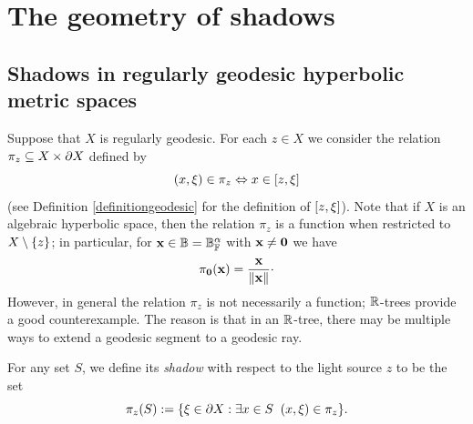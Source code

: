 %
%



\bigskip
\section{The geometry of shadows}\label{subsectionshadows}

\subsection{Shadows in regularly geodesic hyperbolic metric spaces}
Suppose that $X$ is regularly geodesic. For each $z\in X$ we consider the relation $\pi_z\subseteq X\times\partial X$ defined by
\[
(x,\xi)\in \pi_z \Leftrightarrow x\in [z,\xi]
\]
(see Definition \ref{definitiongeodesic} for the definition of $[z,\xi]$). Note that if $X$ is an algebraic hyperbolic space, then the relation $\pi_z$ is a function when restricted to $X\setminus\{z\}$; in particular, for $\xx\in \B = \B_\F^\alpha$ with $\mathbf x\neq\mathbf 0$ we have
\[
\pi_\mathbf 0(\mathbf x) = \frac{\mathbf x}{\|\mathbf x\|}\cdot
\]
However, in general the relation $\pi_z$ is not necessarily a function; $\R$-trees provide a good counterexample. The reason is that in an $\R$-tree, there may be multiple ways to extend a geodesic segment to a geodesic ray.

For any set $S$, we define its \emph{shadow} with respect to the light source $z$ to be the set
\[
\pi_z(S) := \{\xi\in\partial X:\exists x\in S \;\; (x,\xi)\in \pi_z\}.
\]


